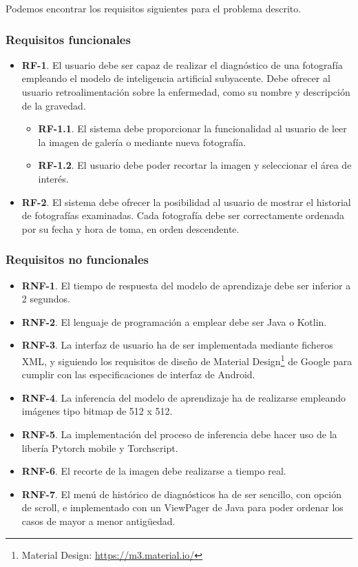 Podemos encontrar los requisitos siguientes para el problema descrito.

\subsubsection{Requisitos funcionales}

\begin{itemize}
	\item \textbf{RF-1}. El usuario debe ser capaz de realizar el diagnóstico de una fotografía empleando el modelo de inteligencia artificial subyacente. Debe ofrecer al usuario retroalimentación sobre la enfermedad, como su nombre y descripción de la gravedad.
	\begin{itemize}
		\item \textbf{RF-1.1}. El sistema debe proporcionar la funcionalidad al usuario de leer la imagen de galería o mediante nueva fotografía.
		\item \textbf{RF-1.2}. El usuario debe poder recortar la imagen y seleccionar el área de interés.
	\end{itemize}
	\item \textbf{RF-2}. El sistema debe ofrecer la posibilidad al usuario de mostrar el historial de fotografías examinadas. Cada fotografía debe ser correctamente ordenada por su fecha y hora de toma, en orden descendente.
\end{itemize}

\subsubsection{Requisitos no funcionales}
	\begin{itemize}
		\item \textbf{RNF-1}. El tiempo de respuesta del modelo de aprendizaje debe ser inferior a 2 segundos.
		\item \textbf{RNF-2}. El lenguaje de programación a emplear debe ser Java o Kotlin.
		\item \textbf{RNF-3}. La interfaz de usuario ha de ser implementada mediante ficheros XML, y siguiendo los requisitos de diseño de Material Design\footnote{Material Design: \url{https://m3.material.io/}} de Google para cumplir con las especificaciones de interfaz de Android.
		\item \textbf{RNF-4}. La inferencia del modelo de aprendizaje ha de realizarse empleando imágenes tipo bitmap de 512 x 512.
		\item \textbf{RNF-5}. La implementación del proceso de inferencia debe hacer uso de la libería Pytorch mobile y Torchscript.
		\item \textbf{RNF-6}. El recorte de la imagen debe realizarse a tiempo real.
		\item \textbf{RNF-7}. El menú de histórico de diagnósticos ha de ser sencillo, con opción de scroll, e implementado con un ViewPager de Java para poder ordenar los casos de mayor a menor antigüedad.
	\end{itemize}
